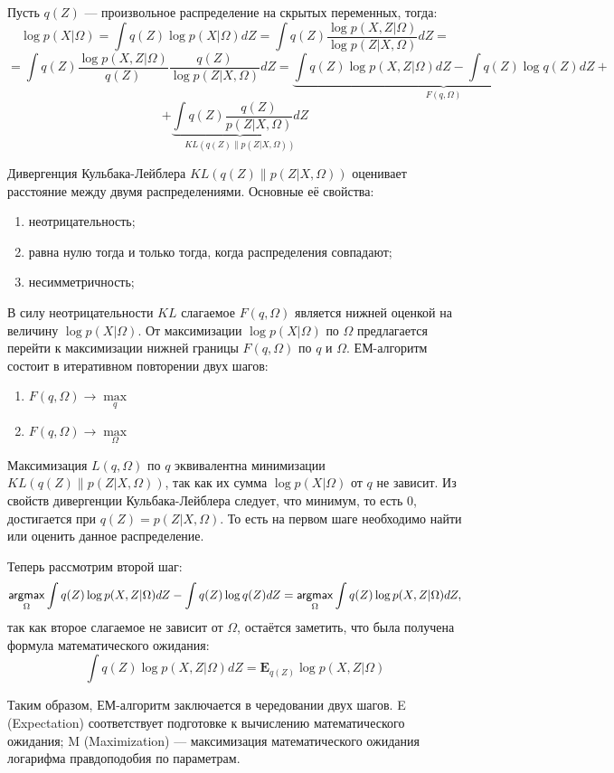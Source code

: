 \documentclass[12pt]{article}
\newcommand{\argmax}{\mathop{\mathsf{argmax}}\limits}
\begin{document}
 Пусть $q(Z)$ --- произвольное распределение на скрытых переменных, тогда:
\[
\log p(X|\Omega) = \int q(Z) \log p(X|\Omega) dZ = \int q(Z) \frac{\log p(X, Z|\Omega)}{\log p(Z|X,\Omega)} dZ = 
\]
\[
=  \int q(Z) \frac{\log p(X, Z|\Omega)}{q(Z)} \frac{q(Z)}{\log p(Z|X,\Omega)} dZ =  \underbrace{  \int q(Z) \log p(X, Z|\Omega) dZ  - \int q(Z) \log q(Z) dZ }_{F(q, \Omega)} +
\]
\[
+  \underbrace{  \int q(Z) \frac{q(Z)}{p(Z|X,\Omega)} dZ }_{KL(q(Z)\|p(Z|X,\Omega))}
\]

Дивергенция Кульбака-Лейблера $KL(q(Z)\|p(Z|X,\Omega))$ оценивает расстояние между двумя распределениями. Основные её свойства:
\begin{enumerate}
\item неотрицательность;
\item равна нулю тогда и только тогда, когда распределения совпадают;
\item несимметричность;
\end{enumerate}

В силу неотрицательности $KL$ слагаемое $F(q, \Omega)$ является нижней оценкой на величину $\log p(X|\Omega)$. От максимизации $\log p(X|\Omega)$ по $\Omega$ предлагается перейти к максимизации нижней границы $F(q, \Omega)$ по $q$ и $\Omega$. ЕМ-алгоритм состоит в итеративном повторении двух шагов:
\begin{enumerate}
\item $F(q, \Omega) \to \max\limits_q$
\item $F(q, \Omega) \to \max\limits_{\Omega}$
\end{enumerate}

Максимизация $L(q, \Omega)$ по $q$ эквивалентна минимизации $KL(q(Z)\|p(Z|X,\Omega))$, так как их сумма $\log p(X|\Omega)$ от $q$ не зависит. Из свойств дивергенции Кульбака-Лейблера следует, что минимум, то есть $0$, достигается при $q(Z) = p(Z|X,\Omega)$. То есть на первом шаге необходимо найти или оценить данное распределение. 

Теперь рассмотрим второй шаг:
\[
\argmax\limits_{\Omega} \int q(Z) \log p(X, Z|\Omega) dZ  - \int q(Z) \log q(Z) dZ  =\argmax\limits_{\Omega}  \int q(Z) \log p(X, Z|\Omega) dZ ,
\]
так как второе слагаемое не зависит от $\Omega$, остаётся заметить, что была получена формула математического ожидания:
\[
 \int q(Z) \log p(X, Z|\Omega) dZ = \mathbf{E}_{q(Z)} \log p(X, Z|\Omega)
\]

Таким образом, ЕМ-алгоритм заключается в чередовании двух шагов. E (Expectation) соответствует подготовке к вычислению математического ожидания; M (Maximization) --- максимизация математического ожидания логарифма правдоподобия по параметрам.
\end{document}
